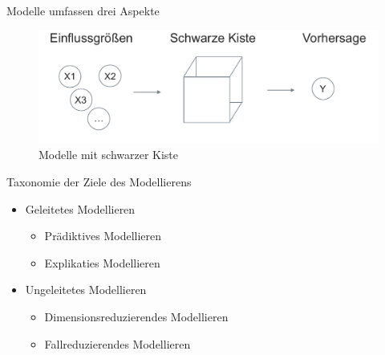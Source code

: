 \begin{frame}{Modelle umfassen drei Aspekte}

\begin{figure}

{\centering \includegraphics[width=0.8\linewidth]{../images/modellieren/Modell_Blackbox} 

}

\caption{Modelle mit schwarzer Kiste}\label{fig:fig-blackbox}
\end{figure}

\end{frame}

\begin{frame}{Taxonomie der Ziele des Modellierens}

\begin{itemize}
\tightlist
\item
  Geleitetes Modellieren

  \begin{itemize}
  \tightlist
  \item
    Prädiktives Modellieren
  \item
    Explikaties Modellieren
  \end{itemize}
\item
  Ungeleitetes Modellieren

  \begin{itemize}
  \tightlist
  \item
    Dimensionsreduzierendes Modellieren
  \item
    Fallreduzierendes Modellieren
  \end{itemize}
\end{itemize}

\end{frame}

